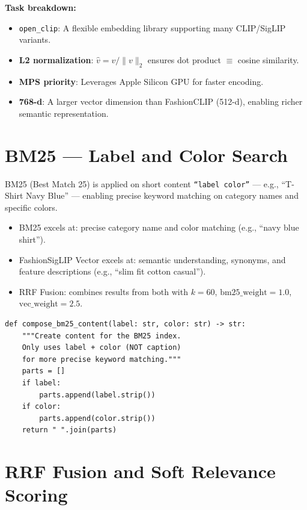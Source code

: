 \documentclass[12pt, twoside]{report}
\begin{document}
\textbf{Task breakdown:}
\begin{itemize}
    \item \texttt{open\_clip}: A flexible embedding library supporting many CLIP/SigLIP variants.
    \item \textbf{L2 normalization}: $\hat{v} = v / \|v\|_2$ ensures dot product $\equiv$ cosine similarity.
    \item \textbf{MPS priority}: Leverages Apple Silicon GPU for faster encoding.
    \item \textbf{768-d}: A larger vector dimension than FashionCLIP (512-d), enabling richer semantic representation.
\end{itemize}

\section{BM25 --- Label and Color Search}
BM25 (Best Match 25) is applied on short content \texttt{``label color''} --- e.g., ``T-Shirt Navy Blue'' --- enabling precise keyword matching on category names and specific colors.

\begin{tcolorbox}[title=Method: Hybrid Search --- BM25 + FashionSigLIP]
\begin{itemize}
    \item BM25 excels at: precise category name and color matching (e.g., ``navy blue shirt'').
    \item FashionSigLIP Vector excels at: semantic understanding, synonyms, and feature descriptions (e.g., ``slim fit cotton casual'').
    \item RRF Fusion: combines results from both with $k = 60$, $\text{bm25\_weight}=1.0$, $\text{vec\_weight}=2.5$.
\end{itemize}
\end{tcolorbox}

\begin{lstlisting}[caption={BM25 content composition --- indexing/build\_index.py}]
def compose_bm25_content(label: str, color: str) -> str:
    """Create content for the BM25 index.
    Only uses label + color (NOT caption)
    for more precise keyword matching."""
    parts = []
    if label:
        parts.append(label.strip())
    if color:
        parts.append(color.strip())
    return " ".join(parts)
\end{lstlisting}

\section{RRF Fusion and Soft Relevance Scoring}
\end{document}
